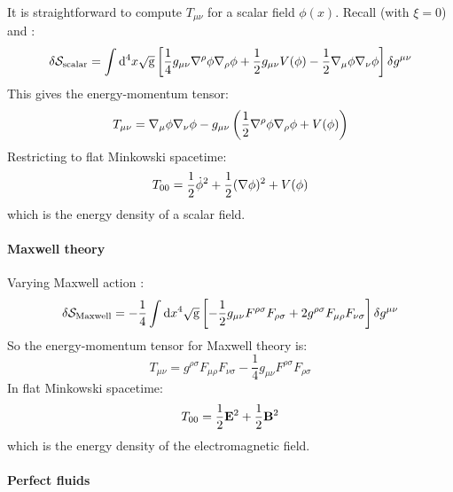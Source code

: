 It is straightforward to compute $ T_{\mu \nu} $ for a scalar field $ \phi(x) $. Recall  (with $ \xi = 0 $) and :
\begin{equation*}
  \delta \mathcal{S}_{\text{scalar}} = \int \mathrm{d}^4 x \sqrt{\mathrm{g}} \left[ \frac{1}{4} g_{\mu \nu} \nabla^\rho \phi \nabla_\rho \phi + \frac{1}{2} g_{\mu \nu} V(\phi) - \frac{1}{2} \nabla_\mu \phi \nabla_\nu \phi \right] \delta g^{\mu \nu}
\end{equation*}
This gives the energy-momentum tensor:
\begin{equation}
  T_{\mu \nu} = \nabla_\mu \phi \nabla_\nu \phi - g_{\mu \nu} \left( \frac{1}{2} \nabla^\rho \phi \nabla_\rho \phi + V(\phi) \right)
  \label{eq:em-tens-scalar}
\end{equation}
Restricting to flat Minkowski spacetime:
\begin{equation*}
  T_{00} = \frac{1}{2} \dot{\phi}^2 + \frac{1}{2} (\nabla \phi)^2 + V(\phi)
\end{equation*}
which is the energy density of a scalar field.

\paragraph{Maxwell theory}

Varying Maxwell action :
\begin{equation*}
  \delta \mathcal{S}_{\text{Maxwell}} = - \frac{1}{4} \int \mathrm{d} x^4 \sqrt{\mathrm{g}} \left[ - \frac{1}{2} g_{\mu \nu} F^{\rho \sigma} F_{\rho \sigma} + 2 g^{\rho \sigma} F_{\mu \rho} F_{\nu \sigma} \right] \delta g^{\mu \nu}
\end{equation*}
So the energy-momentum tensor for Maxwell theory is:
\begin{equation}
  T_{\mu \nu} = g^{\rho \sigma} F_{\mu \rho} F_{\nu \sigma} - \frac{1}{4} g_{\mu \nu} F^{\rho \sigma} F_{\rho \sigma}
\end{equation}
In flat Minkowski spacetime:
\begin{equation*}
  T_{00} = \frac{1}{2} \mathbf{E}^2 + \frac{1}{2} \mathbf{B}^2
\end{equation*}
which is the energy density of the electromagnetic field.

\paragraph{Perfect fluids}

